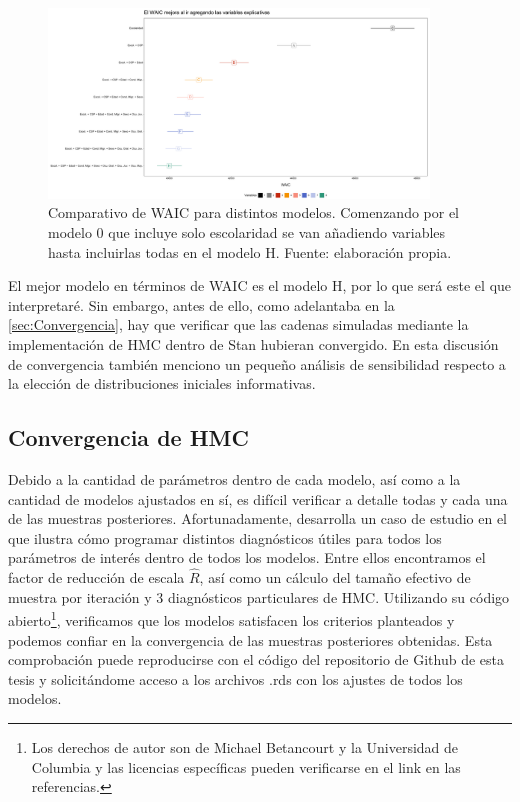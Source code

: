 \begin{figure}[h]
	\centering
	\includegraphics[width = 0.9\textwidth]{Figs/Modelado/Graf_WAIC_Modelos_Compuestos}
	\caption{Comparativo de WAIC para distintos modelos. Comenzando por el modelo 0 que incluye solo escolaridad se van añadiendo variables hasta incluirlas todas en el modelo H. Fuente: elaboración propia.}
	\label{fig:Compara_WAIC_Compuestos}
\end{figure}

El mejor modelo en términos de WAIC es el modelo H, por lo que será este el que interpretaré. Sin embargo, antes de ello, como adelantaba en la \autoref{sec:Convergencia}, hay que verificar que las cadenas simuladas mediante la implementación de HMC dentro de Stan hubieran convergido. En esta discusión de convergencia también menciono un pequeño análisis de sensibilidad respecto a la elección de distribuciones iniciales informativas.

\subsection{Convergencia de HMC}

Debido a la cantidad de parámetros dentro de cada modelo, así como a la cantidad de modelos ajustados en sí, es difícil verificar a detalle todas y cada una de las muestras posteriores. Afortunadamente, \textcite{BetancourtRStanWorkflow} desarrolla un caso de estudio en el que ilustra cómo programar distintos diagnósticos útiles para todos los parámetros de interés dentro de todos los modelos. Entre ellos encontramos el factor de reducción de escala $\hat{R}$, así como un cálculo del tamaño efectivo de muestra por iteración y 3 diagnósticos particulares de HMC. Utilizando su código abierto\footnote{Los derechos de autor son de Michael Betancourt y la Universidad de Columbia y las licencias específicas pueden verificarse en el link en las referencias.}, verificamos que los modelos satisfacen los criterios planteados y podemos confiar en la convergencia de las muestras posteriores obtenidas. Esta comprobación puede reproducirse con el código del repositorio de Github de esta tesis y solicitándome acceso a los archivos .rds con los ajustes de todos los modelos.\\

